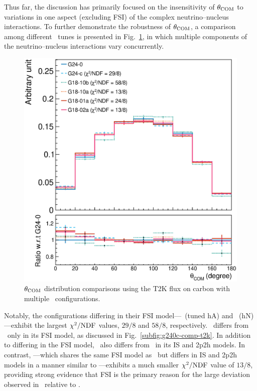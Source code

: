      Thus far, the discussion has primarily focused on the insensitivity of $\theta_{\textrm{COM}}$ to variations in one aspect (excluding FSI) of the complex neutrino–nucleus interactions.
     To further demonstrate the robustness of $\theta_{\textrm{COM}}$, a comparison among different \genie\ tunes is presented in Fig.~\ref{fig:mod-comp}, in which multiple components of the neutrino–nucleus interactions vary concurrently.
     \begin{figure}[ht!]
          \centering
          \includegraphics[width=\scfigwid\textwidth]{figures/COM/anorm-mod-ratio_da_tan.eps}
     \caption{$\theta_{\textrm{COM}}$ distribution comparisons using the T2K flux on carbon with multiple \genie\ configurations. }
     \label{fig:mod-comp}
     \end{figure}

     Notably, the configurations differing in their FSI model—\gC\ (tuned hA) and \getb\ (hN)—exhibit the largest $\chi^2/{\textrm{NDF}}$ values, $29/8$ and $58/8$, respectively.
     \gC\ differs from \gZero\ only in its FSI model, as discussed in Fig.~\ref{subfig:g240c-comp-t2k}.
     In addition to differing in the FSI model, \getb\ also differs from \gZero\ in its IS and 2p2h models.
     In contrast, \geta—which shares the same FSI model as \gZero\ but differs in IS and 2p2h models in a manner similar to \getb—exhibits a much smaller $\chi^2/{\textrm{NDF}}$ value of $13/8$, providing strong evidence that FSI is the primary reason for the large deviation observed in \getb\ relative to \gZero.

